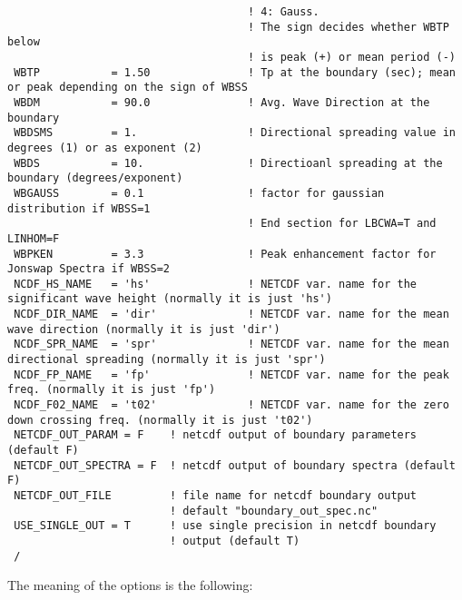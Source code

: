 \documentclass[12pt]{amsart}
\begin{document}
\begin{verbatim}
                                     ! 4: Gauss.
                                     ! The sign decides whether WBTP below 
                                     ! is peak (+) or mean period (-)
 WBTP           = 1.50               ! Tp at the boundary (sec); mean or peak depending on the sign of WBSS
 WBDM           = 90.0               ! Avg. Wave Direction at the boundary
 WBDSMS         = 1.                 ! Directional spreading value in degrees (1) or as exponent (2)
 WBDS           = 10.                ! Directioanl spreading at the boundary (degrees/exponent)
 WBGAUSS        = 0.1                ! factor for gaussian distribution if WBSS=1
                                     ! End section for LBCWA=T and LINHOM=F
 WBPKEN         = 3.3                ! Peak enhancement factor for Jonswap Spectra if WBSS=2
 NCDF_HS_NAME   = 'hs'               ! NETCDF var. name for the significant wave height (normally it is just 'hs')
 NCDF_DIR_NAME  = 'dir'              ! NETCDF var. name for the mean wave direction (normally it is just 'dir')
 NCDF_SPR_NAME  = 'spr'              ! NETCDF var. name for the mean directional spreading (normally it is just 'spr')
 NCDF_FP_NAME   = 'fp'               ! NETCDF var. name for the peak freq. (normally it is just 'fp')
 NCDF_F02_NAME  = 't02'              ! NETCDF var. name for the zero down crossing freq. (normally it is just 't02')
 NETCDF_OUT_PARAM = F    ! netcdf output of boundary parameters (default F)
 NETCDF_OUT_SPECTRA = F  ! netcdf output of boundary spectra (default F)
 NETCDF_OUT_FILE         ! file name for netcdf boundary output
                         ! default "boundary_out_spec.nc"
 USE_SINGLE_OUT = T      ! use single precision in netcdf boundary
                         ! output (default T)
 /
\end{verbatim}
The meaning of the options is the following:
\end{document}
